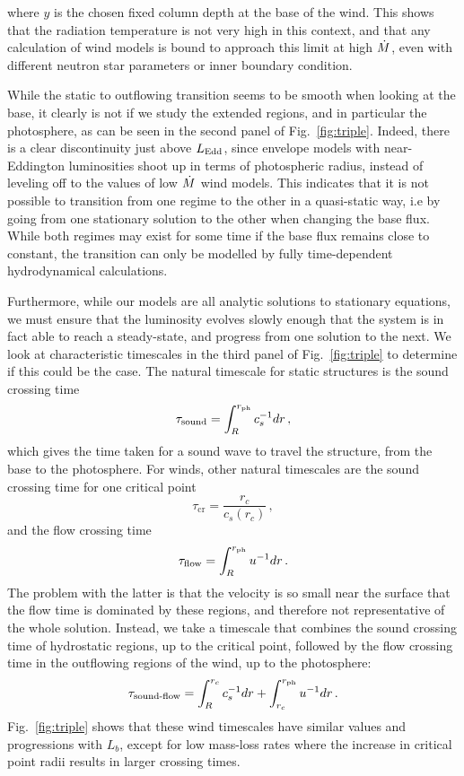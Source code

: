 \documentclass[../main.tex]{subfiles}
\begin{document}
\newpage

\noindent where $y$ is the chosen fixed column depth at the base of the wind. This shows that the radiation temperature is not very high in this context, and that any calculation of wind models is bound to approach this limit at high $\dot{M}$, even with different neutron star parameters or inner boundary condition. 

While the static to outflowing transition seems to be smooth when looking at the base, it clearly is not if we study the extended regions, and in particular the photosphere, as can be seen in the second panel of Fig.~\ref{fig:triple}. Indeed, there is a clear discontinuity just above $L_\text{Edd}$, since envelope models with near-Eddington luminosities shoot up in terms of photospheric radius, instead of leveling off to the values of low $\dot{M}$ wind models. This indicates that it is not possible to transition from one regime to the other in a quasi-static way, i.e by going from one stationary solution to the other when changing the base flux.  While both regimes may exist for some time if the base flux remains close to constant, the transition can only be modelled by fully time-dependent hydrodynamical calculations.  

Furthermore, while our models are all analytic solutions to stationary equations, we must ensure that the luminosity evolves slowly enough that the system is in fact able to reach a steady-state, and progress from one solution to the next.  We look at characteristic timescales in the third panel of Fig.~\ref{fig:triple} to determine if this could be the case.  The natural timescale for static structures is the sound crossing time
\begin{equation}
    \tau_\text{sound}=\int_R^{r_\text{ph}}c_s^{-1}dr\,,
\end{equation}
which gives the time taken for a sound wave to travel the structure, from the base to the photosphere. For winds, other natural timescales are the sound crossing time for one critical point
\begin{equation}
    \tau_\text{cr}=\frac{r_c}{c_s(r_c)}\,,
\end{equation}
and the flow crossing time
\begin{equation}
    \tau_\text{flow}=\int_R^{r_\text{ph}}u^{-1}dr\, .
\end{equation}
The problem with the latter is that the velocity is so small near the surface that the flow time is dominated by these regions, and therefore not representative of the whole solution. Instead, we take a timescale that combines the sound crossing time of hydrostatic regions, up to the critical point, followed by the flow crossing time in the outflowing regions of the wind, up to the photosphere:
\begin{equation}
    \tau_\text{sound-flow}=\int_R^{r_c}c_s^{-1}dr + \int_{r_c}^{r_\text{ph}}u^{-1}dr \,.
\end{equation}
Fig.~\ref{fig:triple} shows that these wind timescales have similar values and progressions with $L_b$, except for low mass-loss rates where the increase in critical point radii results in larger crossing times. 
\end{document}
